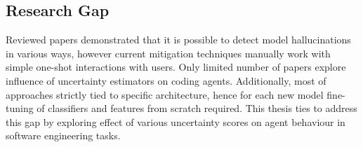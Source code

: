 \subsection{Research Gap}
Reviewed papers demonstrated that it is possible to detect model hallucinations in various ways, however current
mitigation techniques manually work with simple one-shot interactions with users. Only limited number of
papers explore influence of uncertainty estimators on coding agents.
Additionally, most of approaches strictly tied to specific architecture, hence for each
new model fine-tuning of classifiers and features from scratch required. 
This thesis ties to address this gap by exploring effect of various uncertainty scores
on agent behaviour in software engineering tasks.
